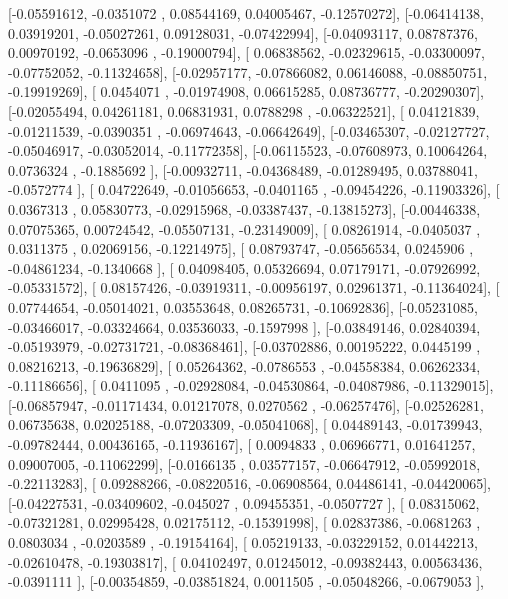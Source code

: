 \documentclass{article}
\begin{document}
       [-0.05591612, -0.0351072 ,  0.08544169,  0.04005467, -0.12570272],
       [-0.06414138,  0.03919201, -0.05027261,  0.09128031, -0.07422994],
       [-0.04093117,  0.08787376,  0.00970192, -0.0653096 , -0.19000794],
       [ 0.06838562, -0.02329615, -0.03300097, -0.07752052, -0.11324658],
       [-0.02957177, -0.07866082,  0.06146088, -0.08850751, -0.19919269],
       [ 0.0454071 , -0.01974908,  0.06615285,  0.08736777, -0.20290307],
       [-0.02055494,  0.04261181,  0.06831931,  0.0788298 , -0.06322521],
       [ 0.04121839, -0.01211539, -0.0390351 , -0.06974643, -0.06642649],
       [-0.03465307, -0.02127727, -0.05046917, -0.03052014, -0.11772358],
       [-0.06115523, -0.07608973,  0.10064264,  0.0736324 , -0.1885692 ],
       [-0.00932711, -0.04368489, -0.01289495,  0.03788041, -0.0572774 ],
       [ 0.04722649, -0.01056653, -0.0401165 , -0.09454226, -0.11903326],
       [ 0.0367313 ,  0.05830773, -0.02915968, -0.03387437, -0.13815273],
       [-0.00446338,  0.07075365,  0.00724542, -0.05507131, -0.23149009],
       [ 0.08261914, -0.0405037 ,  0.0311375 ,  0.02069156, -0.12214975],
       [ 0.08793747, -0.05656534,  0.0245906 , -0.04861234, -0.1340668 ],
       [ 0.04098405,  0.05326694,  0.07179171, -0.07926992, -0.05331572],
       [ 0.08157426, -0.03919311, -0.00956197,  0.02961371, -0.11364024],
       [ 0.07744654, -0.05014021,  0.03553648,  0.08265731, -0.10692836],
       [-0.05231085, -0.03466017, -0.03324664,  0.03536033, -0.1597998 ],
       [-0.03849146,  0.02840394, -0.05193979, -0.02731721, -0.08368461],
       [-0.03702886,  0.00195222,  0.0445199 ,  0.08216213, -0.19636829],
       [ 0.05264362, -0.0786553 , -0.04558384,  0.06262334, -0.11186656],
       [ 0.0411095 , -0.02928084, -0.04530864, -0.04087986, -0.11329015],
       [-0.06857947, -0.01171434,  0.01217078,  0.0270562 , -0.06257476],
       [-0.02526281,  0.06735638,  0.02025188, -0.07203309, -0.05041068],
       [ 0.04489143, -0.01739943, -0.09782444,  0.00436165, -0.11936167],
       [ 0.0094833 ,  0.06966771,  0.01641257,  0.09007005, -0.11062299],
       [-0.0166135 ,  0.03577157, -0.06647912, -0.05992018, -0.22113283],
       [ 0.09288266, -0.08220516, -0.06908564,  0.04486141, -0.04420065],
       [-0.04227531, -0.03409602, -0.045027  ,  0.09455351, -0.0507727 ],
       [ 0.08315062, -0.07321281,  0.02995428,  0.02175112, -0.15391998],
       [ 0.02837386, -0.0681263 ,  0.0803034 , -0.0203589 , -0.19154164],
       [ 0.05219133, -0.03229152,  0.01442213, -0.02610478, -0.19303817],
       [ 0.04102497,  0.01245012, -0.09382443,  0.00563436, -0.0391111 ],
       [-0.00354859, -0.03851824,  0.0011505 , -0.05048266, -0.0679053 ],
\end{document}
